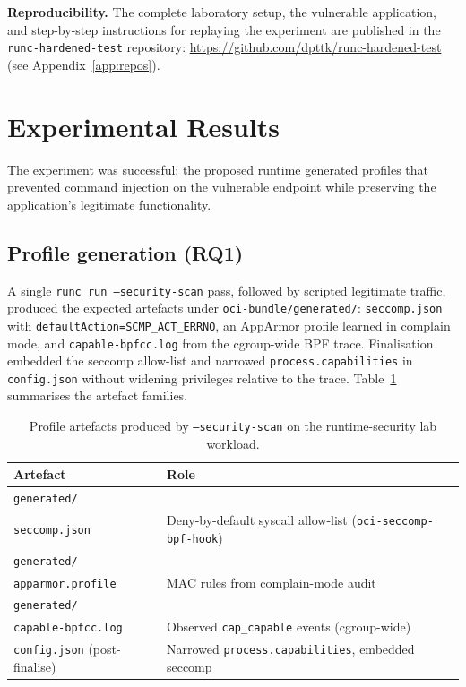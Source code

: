 \textbf{Reproducibility.} The complete laboratory setup, the vulnerable application, and step-by-step instructions for replaying the experiment are published in the \texttt{runc-hardened-test} repository: \url{https://github.com/dpttk/runc-hardened-test} (see Appendix~\ref{app:repos}).

\section{Experimental Results}\label{sec:exp-results}

The experiment was successful: the proposed runtime generated profiles that prevented command injection on the vulnerable endpoint while preserving the application's legitimate functionality.

\subsection{Profile generation (RQ1)}

A single \texttt{runc run --security-scan} pass, followed by scripted legitimate traffic, produced the expected artefacts under \texttt{oci-bundle/generated/}: \texttt{seccomp.json} with \texttt{defaultAction=SCMP\_ACT\_ERRNO}, an AppArmor profile learned in complain mode, and \texttt{capable-bpfcc.log} from the cgroup-wide BPF trace. Finalisation embedded the seccomp allow-list and narrowed \texttt{process.capabilities} in \texttt{config.json} without widening privileges relative to the trace. Table~\ref{tab:profquality-lab} summarises the artefact families.

\begin{table}[ht]
\centering
\caption[Profile artefacts produced by scan.]{Profile artefacts produced by \texttt{--security-scan} on the runtime-security lab workload.}
\label{tab:profquality-lab}
\begin{tabularx}{\textwidth}{>{\raggedright\arraybackslash}p{4.2cm} X}
\toprule
\textbf{Artefact} & \textbf{Role} \\
\midrule
\texttt{generated/}\\\texttt{seccomp.json} & Deny-by-default syscall allow-list (\texttt{oci-seccomp-bpf-hook}) \\
\texttt{generated/}\\\texttt{apparmor.profile} & MAC rules from complain-mode audit \\
\texttt{generated/}\\\texttt{capable-bpfcc.log} & Observed \texttt{cap\_capable} events (cgroup-wide) \\
\texttt{config.json} (post-finalise) & Narrowed \texttt{process.capabilities}, embedded seccomp \\
\bottomrule
\end{tabularx}
\end{table}

